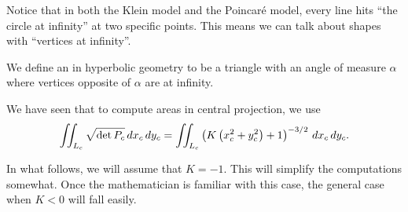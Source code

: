 \documentclass[newpage,hints,12pt,nooutcomes,noauthor]{ximera}
\begin{document}
Notice that in both the Klein model and the Poincar\'e model, every line hits
``the circle at infinity'' at two specific points.  This means we can talk about
shapes with ``vertices at infinity''.

\begin{definition}
  We define an  in hyperbolic geometry to be a
  triangle with an angle of measure $\alpha$ where vertices opposite of $\alpha$
  are at infinity.
\end{definition}

We have seen that to compute areas in central projection, we use
\[
  \iint_{L_c} \sqrt{\det P_c}\,d x_c\,d y_c
  =\iint_{L_c} \left(K\left(x_c^2+y_c^2\right)+1\right)^{-3/2} \,d x_c\,d y_c.
\]


In what follows, we will assume that $K=-1$. This will simplify the
computations somewhat. Once the mathematician is familiar with this
case, the general case when $K<0$ will fall easily.
\end{document}
